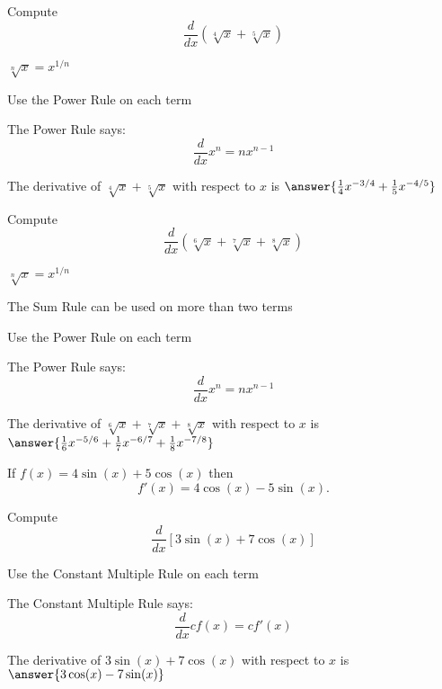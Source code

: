 \documentclass[handout]{ximera}
\begin{document}
\begin{problem} %
  Compute 
  \[
  \frac{d}{dx} \left(\sqrt[4] x + \sqrt[5] x\right)
  \]
  
    \begin{hint}
		 $\sqrt[n] x = x^{1/n}$
		\end{hint}
		\begin{hint}
      Use the Power Rule on each term
    \end{hint}
    \begin{hint}
      The Power Rule says:
      \[
      \frac{d}{dx} x^n = nx^{n-1}
      \]
    \end{hint}    
		The derivative of $\sqrt[4] x + \sqrt[5] x$ with respect to $x$ is
		 $\answer{\frac14 x^{-3/4} + \frac15 x^{-4/5}}$
	
\end{problem}


\begin{problem} %
  Compute 
  \[
  \frac{d}{dx} \left(\sqrt[6] x + \sqrt[7] x + \sqrt[8] x\right)
  \]
  
    \begin{hint}
		 $\sqrt[n] x = x^{1/n}$
		\end{hint}
		\begin{hint}
		  The Sum Rule can be used on more than two terms
		\end{hint}
		\begin{hint}
      Use the Power Rule on each term
    \end{hint}
    \begin{hint}
      The Power Rule says:
      \[
      \frac{d}{dx} x^n = nx^{n-1}
      \]
    \end{hint}    
		The derivative of $\sqrt[6] x + \sqrt[7] x + \sqrt[8] x$ with respect to $x$ is
		 $\answer{\frac16 x^{-5/6} + \frac17 x^{-6/7} + \frac18 x^{-7/8}}$
	
\end{problem}

\begin{example} %
 If $f(x) = 4\sin(x) + 5\cos(x)$ then 
\[f'(x) = 4\cos(x) - 5\sin(x).\]
\end{example}


\begin{problem} %
  Compute 
  \[
  \frac{d}{dx} \left[3\sin(x) + 7\cos(x)\right]
  \]
  
		\begin{hint}
      Use the Constant Multiple Rule on each term
    \end{hint}
    \begin{hint}
      The Constant Multiple Rule says:
      \[
      \frac{d}{dx} cf(x) = cf'(x)
      \]
    \end{hint}    
		The derivative of $3\sin(x) + 7\cos(x)$ with respect to $x$ is
		 $\answer{3\cos(x) - 7\sin(x)}$
	
\end{problem}
\end{document}
